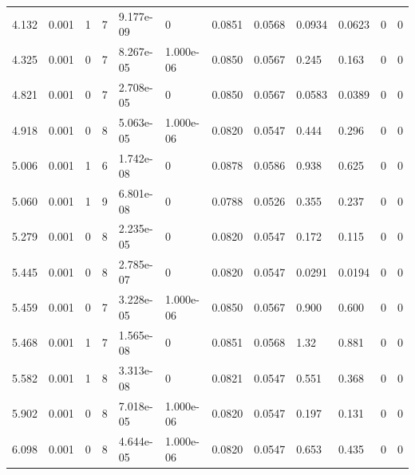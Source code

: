\documentclass[preview]{standalone}
\begin{document}
{{\begin{tabular}{L{1.2cm}C{1.2cm} C{0.3cm}C{0.5cm} C{1.4cm}C{1.4cm} C{1.4cm}C{1.4cm} C{1.6cm}C{1.6cm} C{1.6cm}C{1.6cm}}
  4.132  &  0.001  & 1     &  7 &  9.177e-09  & 0  &  0.0851&   0.0568& 0.0934 & 0.0623   &  0 & 0  \\ 
  4.325  &  0.001  & 0     &  7 &  8.267e-05  & 1.000e-06  &  0.0850&   0.0567& 0.245 & 0.163   &  0 & 0  \\ 
  4.821  &  0.001  & 0     &  7 &  2.708e-05  & 0  &  0.0850&   0.0567& 0.0583 & 0.0389   &  0 & 0  \\ 
  4.918  &  0.001  & 0     &  8 &  5.063e-05  & 1.000e-06  &  0.0820&   0.0547& 0.444 & 0.296   &  0 & 0  \\ 
  5.006  &  0.001  & 1     &  6 &  1.742e-08  & 0  &  0.0878&   0.0586& 0.938 & 0.625   &  0 & 0  \\ 
  5.060  &  0.001  & 1     &  9 &  6.801e-08  & 0  &  0.0788&   0.0526& 0.355 & 0.237   &  0 & 0  \\ 
  5.279  &  0.001  & 0     &  8 &  2.235e-05  & 0  &  0.0820&   0.0547& 0.172 & 0.115   &  0 & 0  \\ 
  5.445  &  0.001  & 0     &  8 &  2.785e-07  & 0  &  0.0820&   0.0547& 0.0291 & 0.0194   &  0 & 0  \\ 
  5.459  &  0.001  & 0     &  7 &  3.228e-05  & 1.000e-06  &  0.0850&   0.0567& 0.900 & 0.600   &  0 & 0  \\ 
  5.468  &  0.001  & 1     &  7 &  1.565e-08  & 0  &  0.0851&   0.0568& 1.32 & 0.881   &  0 & 0  \\ 
  5.582  &  0.001  & 1     &  8 &  3.313e-08  & 0  &  0.0821&   0.0547& 0.551 & 0.368   &  0 & 0  \\ 
  5.902  &  0.001  & 0     &  8 &  7.018e-05  & 1.000e-06  &  0.0820&   0.0547& 0.197 & 0.131   &  0 & 0  \\ 
  6.098  &  0.001  & 0     &  8 &  4.644e-05  & 1.000e-06  &  0.0820&   0.0547& 0.653 & 0.435   &  0 & 0  \\ 
\hline 
\end{tabular} 

}}
\end{document}
